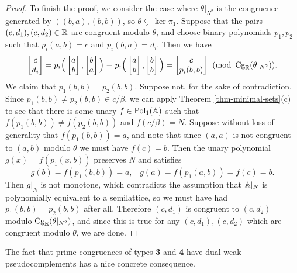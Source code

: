 \begin{appendices}
\begin{proof}
To finish the proof, we consider the case where $\theta|_{N^2}$ is the congruence generated by $((b,a),(b,b))$, so $\theta \subsetneq \ker \pi_1$. Suppose that the pairs $(c,d_1), (c,d_2) \in \mathbb{R}$ are congruent modulo $\theta$, and choose binary polynomials $p_1,p_2$ such that $p_i(a,b) = c$ and $p_i(b,a) = d_i$. Then we have
\[
\begin{bmatrix} c\\ d_i\end{bmatrix} = p_i\Big(\begin{bmatrix} a\\ b\end{bmatrix}, \begin{bmatrix} b\\ a\end{bmatrix}\Big) \equiv p_i\Big(\begin{bmatrix} a\\ b\end{bmatrix}, \begin{bmatrix} b\\ b\end{bmatrix}\Big) = \begin{bmatrix} c\\ p_i(b,b)\end{bmatrix} \pmod{\operatorname{Cg}_{\mathbb{R}}(\theta|_{N^2})}.
\]
We claim that $p_1(b,b) = p_2(b,b)$. Suppose not, for the sake of contradiction. Since $p_1(b,b) \ne p_2(b,b) \in c/\beta$, we can apply Theorem \ref{thm-minimal-sets}(c) to see that there is some unary $f \in \operatorname{Pol}_1(\mathbb{A})$ such that $f(p_1(b,b)) \ne f(p_2(b,b))$ and $f(c/\beta) = N$. Suppose without loss of generality that $f(p_1(b,b)) = a$, and note that since $(a,a)$ is not congruent to $(a,b)$ modulo $\theta$ we must have $f(c) = b$. Then the unary polynomial $g(x) = f(p_1(x,b))$ preserves $N$ and satisfies
\[
g(b) = f(p_1(b,b)) = a, \;\;\; g(a) = f(p_1(a,b)) = f(c) = b.
\]
Then $g|_N$ is not monotone, which contradicts the assumption that $\mathbb{A}|_N$ is polynomially equivalent to a semilattice, so we must have had $p_1(b,b) = p_2(b,b)$ after all. Therefore $(c,d_1)$ is congruent to $(c,d_2)$ modulo $\operatorname{Cg}_{\mathbb{R}}(\theta|_{N^2})$, and since this is true for any $(c,d_1),(c,d_2)$ which are congruent modulo $\theta$, we are done.
\end{proof}

The fact that prime congruences of types \textbf{3} and \textbf{4} have dual weak pseudocomplements has a nice concrete consequence.


\end{appendices}
